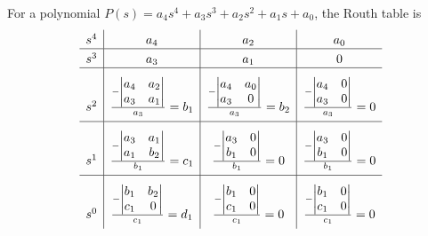 \documentclass[10pt, twocolumn]{article}
\begin{document}
For a polynomial \(P(s) = a_4 s^4 + a_3 s^3 + a_2 s^2 + a_1 s + a_0\), the Routh table is
\[
  \begin{array}{c|c|c|c}
    s^4 & a_4                                            & a_2                                            & a_0                                          \rule{0pt}{2.6ex} \rule[-0.9ex]{0pt}{0pt} \\ \hline
    s^3 & a_3                                            & a_1                                            & 0                                            \rule{0pt}{2.6ex} \rule[-0.9ex]{0pt}{0pt} \\ \hline
    s^2 & \frac{- \begin{vmatrix}
        a_4 & a_2 \\
        a_3 & a_1
      \end{vmatrix}}{a_3} = b_1 & \frac{- \begin{vmatrix}
        a_4 & a_0 \\
        a_3 & 0
      \end{vmatrix}}{a_3} = b_2 & \frac{- \begin{vmatrix}
        a_4 & 0 \\
        a_3 & 0
      \end{vmatrix}}{a_3} = 0 \rule{0pt}{8ex} \rule[-2ex]{0pt}{0pt}     \\ \hline
    s^1 & \frac{- \begin{vmatrix}
        a_3 & a_1 \\
        a_1 & b_2
      \end{vmatrix}}{b_1} = c_1 & \frac{- \begin{vmatrix}
        a_3 & 0 \\
        b_1 & 0
      \end{vmatrix}}{b_1} = 0   & \frac{- \begin{vmatrix}
        a_3 & 0 \\
        b_1 & 0
      \end{vmatrix}}{b_1} = 0 \rule{0pt}{8ex} \rule[-2ex]{0pt}{0pt}     \\ \hline
    s^0 & \frac{- \begin{vmatrix}
        b_1 & b_2 \\
        c_1 & 0
      \end{vmatrix}}{c_1} = d_1 & \frac{- \begin{vmatrix}
        b_1 & 0 \\
        c_1 & 0
      \end{vmatrix}}{c_1} = 0   & \frac{- \begin{vmatrix}
        b_1 & 0 \\
        c_1 & 0
      \end{vmatrix}}{c_1} = 0 \rule{0pt}{8ex} \rule[-2ex]{0pt}{0pt}
  \end{array}
\]
\end{document}
